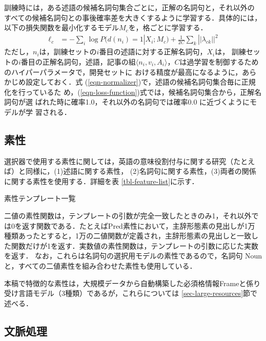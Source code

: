 \documentclass[japanese]{jnlp_1.4}
\begin{document}
訓練時には，ある述語の候補名詞句集合ごとに，正解の名詞句と，それ以外の
すべての候補名詞句との事後確率差を大きくするように学習する．具体的には，
以下の損失関数を最小化するモデル$M_c$を，格ごとに学習する．
\begin{align}
\ell_{c} & =
- \sum_{i} \log P(d(n_i)=1|X_i;M_c) 
+ \frac{1}{2C} \sum_{k} ||\lambda_{ck}||^{2}
\label{eqn-loss-function}
\end{align}
ただし，$n_i$は，訓練セットの$i$番目の述語に対する正解名詞句，$X_i$は，
訓練セットの$i$番目の正解名詞句，述語，記事の組$\langle n_i, v_i, A_i
\rangle$，$C$は過学習を制御するためのハイパーパラメータで，開発セットに
おける精度が最高になるように，あらかじめ設定しておく．式
(\ref{eqn-normalizer})で，述語の候補名詞句集合毎に正規化を行っているた
め，(\ref{eqn-loss-function})式では，候補名詞句集合から，正解名詞句が選
ばれた時に確率1.0，それ以外の名詞句では確率0.0 に近づくようにモデルが学
習される．


\subsection{素性}
\label{sec-features}

選択器で使用する素性に関しては，英語の意味役割付与に関する研究（たとえ
ば）と同様に，(1)述語に関する素性，
(2)名詞句に関する素性，(3)両者の関係に関する素性を使用する．詳細を表
\ref{tbl-feature-list}に示す．

\begin{table}[b]
\caption{素性テンプレート一覧}
\label{tbl-feature-list}

\end{table}

二値の素性関数は，テンプレートの引数が完全一致したときのみ1，それ以外で
は0を返す関数である．たとえばPred素性において，主辞形態素の見出しが1万
種類あったとすると，1万の二値関数が定義され，主辞形態素の見出しと一致し
た関数だけが1を返す．実数値の素性関数は，テンプレートの引数に応じた実数
を返す． なお，これらは名詞句の選択用モデルの素性であるので，名詞句
Nounと，すべての二値素性を組み合わせた素性も使用している．

本稿で特徴的な素性は，大規模データから自動構築した必須格情報Frameと係り
受け言語モデル（3種類）であるが，これらについては
\ref{sec-large-resources}節で述べる．


\subsection{文脈処理}
\label{sec-context-processing}
\end{document}
